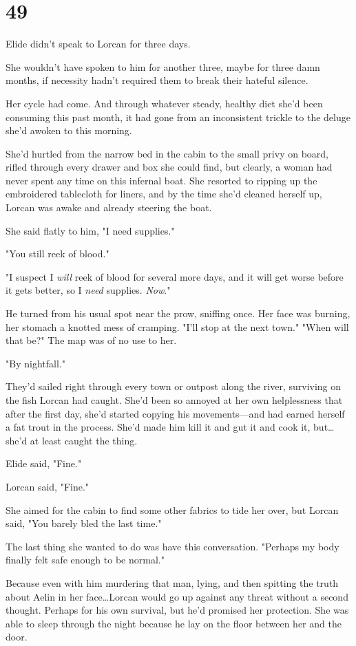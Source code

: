 
\chapter{49}

Elide didn't speak to Lorcan for three days.

She wouldn't have spoken to him for another three, maybe for three damn months, if necessity hadn't required them to break their hateful silence.

Her cycle had come.
And through whatever steady, healthy diet she'd been consuming this past month, it had gone from an inconsistent trickle to the deluge she'd awoken to this morning.

She'd hurtled from the narrow bed in the cabin to the small privy on board, rifled through every drawer and box she could find, but 
clearly, a woman had never spent any time on this infernal boat.
She resorted to ripping up the embroidered tablecloth for liners, and by the time she'd cleaned herself up, Lorcan was awake and already steering the boat.

She said flatly to him, "I need supplies."

"You still reek of blood."

"I suspect I \emph{will} reek of blood for several more days, and it will get worse before it gets better, so I \emph{need} supplies.
\emph{Now}."

He turned from his usual spot near the prow, sniffing once.
Her face was burning, her stomach a knotted mess of cramping.
"I'll stop at the next town."
"When will that be?"
The map was of no use to her.

"By nightfall."

They'd sailed right through every town or outpost along the river, surviving on the fish Lorcan had caught.
She'd been so annoyed at her own helplessness that after the first day, she'd started copying his movements---and had earned herself a fat trout in the process.
She'd made him kill it and gut it and cook it, but\ldots she'd at least caught the thing.

Elide said, "Fine."

Lorcan said, "Fine."

She aimed for the cabin to find some other fabrics to tide her over, but Lorcan said, "You barely bled the last time."

The last thing she wanted to do was have this conversation.
"Perhaps my body finally felt safe enough to be normal."

Because even with him murdering that man, lying, and then spitting the truth about Aelin in her face\ldots Lorcan would go up against any threat without a second thought.
Perhaps for his own survival, but he'd promised her protection.
She was able to sleep through the night because he lay on the floor between her and the door.


